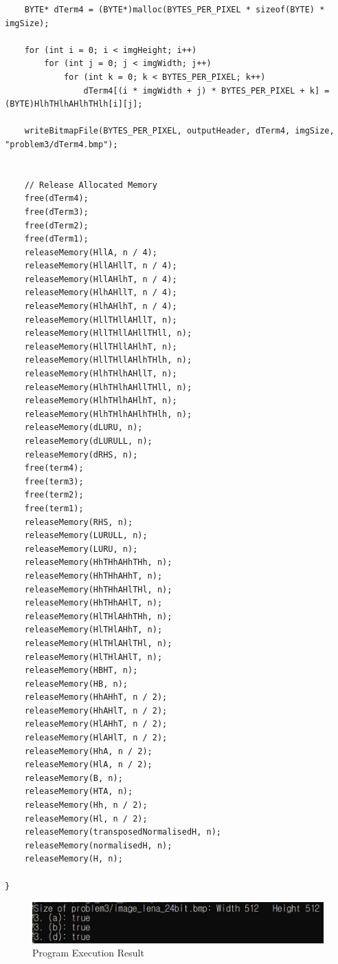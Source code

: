 \begin{verbatim}
    BYTE* dTerm4 = (BYTE*)malloc(BYTES_PER_PIXEL * sizeof(BYTE) * imgSize);

    for (int i = 0; i < imgHeight; i++)
        for (int j = 0; j < imgWidth; j++)
            for (int k = 0; k < BYTES_PER_PIXEL; k++)
                dTerm4[(i * imgWidth + j) * BYTES_PER_PIXEL + k] = (BYTE)HlhTHlhAHlhTHlh[i][j];

    writeBitmapFile(BYTES_PER_PIXEL, outputHeader, dTerm4, imgSize, "problem3/dTerm4.bmp");

    
    // Release Allocated Memory
    free(dTerm4);
    free(dTerm3);
    free(dTerm2);
    free(dTerm1);
    releaseMemory(HllA, n / 4);
    releaseMemory(HllAHllT, n / 4);
    releaseMemory(HllAHlhT, n / 4);
    releaseMemory(HlhAHllT, n / 4);
    releaseMemory(HlhAHlhT, n / 4);
    releaseMemory(HllTHllAHllT, n);
    releaseMemory(HllTHllAHllTHll, n);
    releaseMemory(HllTHllAHlhT, n);
    releaseMemory(HllTHllAHlhTHlh, n);
    releaseMemory(HlhTHlhAHllT, n);
    releaseMemory(HlhTHlhAHllTHll, n);
    releaseMemory(HlhTHlhAHlhT, n);
    releaseMemory(HlhTHlhAHlhTHlh, n);
    releaseMemory(dLURU, n);
    releaseMemory(dLURULL, n);
    releaseMemory(dRHS, n);
    free(term4);
    free(term3);
    free(term2);
    free(term1);
    releaseMemory(RHS, n);
    releaseMemory(LURULL, n);
    releaseMemory(LURU, n);
    releaseMemory(HhTHhAHhTHh, n);
    releaseMemory(HhTHhAHhT, n);
    releaseMemory(HhTHhAHlTHl, n);
    releaseMemory(HhTHhAHlT, n);
    releaseMemory(HlTHlAHhTHh, n);
    releaseMemory(HlTHlAHhT, n);
    releaseMemory(HlTHlAHlTHl, n);
    releaseMemory(HlTHlAHlT, n);
    releaseMemory(HBHT, n);
    releaseMemory(HB, n);
    releaseMemory(HhAHhT, n / 2);
    releaseMemory(HhAHlT, n / 2);
    releaseMemory(HlAHhT, n / 2);
    releaseMemory(HlAHlT, n / 2);
    releaseMemory(HhA, n / 2);
    releaseMemory(HlA, n / 2);
    releaseMemory(B, n);
    releaseMemory(HTA, n);
    releaseMemory(Hh, n / 2);
    releaseMemory(Hl, n / 2);
    releaseMemory(transposedNormalisedH, n);
    releaseMemory(normalisedH, n);
    releaseMemory(H, n);
    
}
\end{verbatim}
\begin{figure}[H]
    \centering
    \includegraphics{execution.png}
    \caption{Program Execution Result}
\end{figure}

